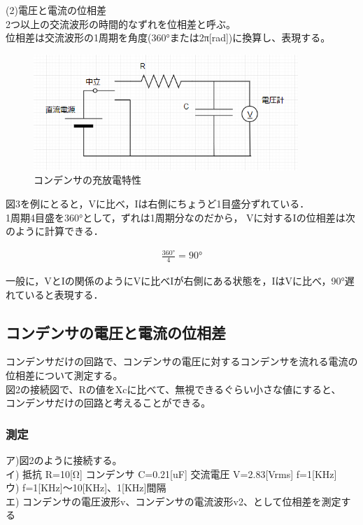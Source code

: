 \documentclass[titlepage]{jarticle}
\begin{document}
(2)電圧と電流の位相差\\
2つ以上の交流波形の時間的なずれを位相差と呼ぶ。\\位相差は交流波形の1周期を角度(360°または2π[rad])に換算し、表現する。
\begin{figure}[H]
    \begin{center}
        \includegraphics[width=10cm]{image/3.png}
        \caption{コンデンサの充放電特性}
    \end{center}
\end{figure}

図3を例にとると，Vに比べ，Iは右側にちょうど1目盛分ずれている．\\1周期4目盛を360°として，ずれは1周期分なのだから，
Vに対するIの位相差は次のように計算できる．

\begin{eqnarray}
    \frac{360°}{4}=90°\nonumber
\end{eqnarray}

一般に，VとIの関係のようにVに比べIが右側にある状態を，IはVに比べ，90°遅れていると表現する．

\subsection{コンデンサの電圧と電流の位相差}
コンデンサだけの回路で、コンデンサの電圧に対するコンデンサを流れる電流の位相差について測定する。\\
図2の接続図で、Rの値をXcに比べて、無視できるぐらい小さな値にすると、\\コンデンサだけの回路と考えることができる。
\subsubsection{測定}
\begin{flushleft}
    ア)図2のように接続する。\\
    イ) 抵抗 R=10[Ω] コンデンサ C=0.21[uF] 交流電圧 V=2.83[Vrms] f=1[KHz]\\
    ウ) f=1[KHz]～10[KHz]、1[KHz]間隔\\
    エ) コンデンサの電圧波形v、コンデンサの電流波形v2、として位相差を測定する\\
\end{flushleft}
\end{document}
